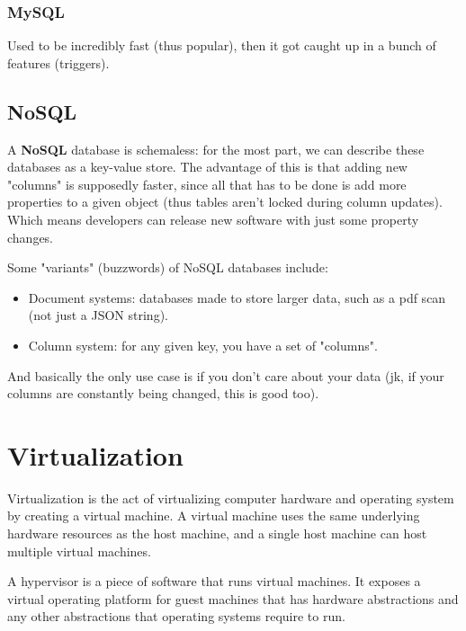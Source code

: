 \documentclass{report}
\newcommand{\npar}{\par\noindent}
\newcommand{\vpar}{\vspace{1em}\npar}
\begin{document}
\subsection{MySQL}

\par Used to be incredibly fast (thus popular), then it got caught up in a bunch of features (triggers).

\section{NoSQL}

\par A \textbf{NoSQL} database is schemaless: for the most part, we can describe these databases as a key-value store. The advantage of this is that adding new "columns" is supposedly faster, since all that has to be done is add more properties to a given object (thus tables aren't locked during column updates). Which means developers can release new software with just some property changes.

\vpar Some "variants" (buzzwords) of NoSQL databases include:

\begin{itemize}
    \item Document systems: databases made to store larger data, such as a pdf scan (not just a JSON string).
    \item Column system: for any given key, you have a set of "columns".
\end{itemize}

\vpar And basically the only use case is if you don't care about your data (jk, if your columns are constantly being changed, this is good too).

\chapter{Virtualization}

\par Virtualization is the act of virtualizing computer hardware and operating system by creating a virtual machine. A virtual machine uses the same underlying hardware resources as the host machine, and a single host machine can host multiple virtual machines.

\vpar A hypervisor is a piece of software that runs virtual machines. It exposes a virtual operating platform for guest machines that has hardware abstractions and any other abstractions that operating systems require to run.
\end{document}
